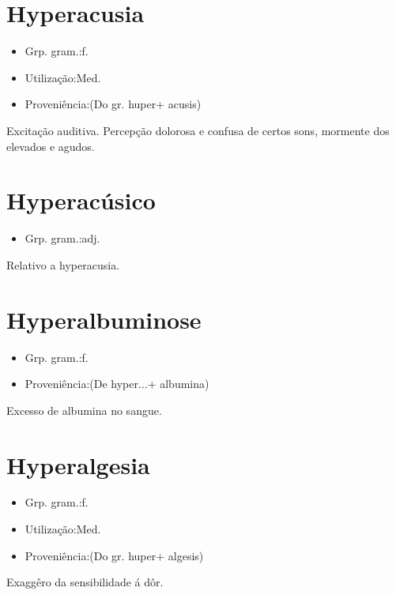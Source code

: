 \documentclass{article}
\begin{document}
\section{Hyperacusia}
\begin{itemize}
\item {Grp. gram.:f.}
\end{itemize}
\begin{itemize}
\item {Utilização:Med.}
\end{itemize}
\begin{itemize}
\item {Proveniência:(Do gr. \textunderscore huper\textunderscore  + \textunderscore acusis\textunderscore )}
\end{itemize}
Excitação auditiva.
Percepção dolorosa e confusa de certos sons, mormente dos elevados e agudos.
\section{Hyperacúsico}
\begin{itemize}
\item {Grp. gram.:adj.}
\end{itemize}
Relativo a hyperacusia.
\section{Hyperalbuminose}
\begin{itemize}
\item {Grp. gram.:f.}
\end{itemize}
\begin{itemize}
\item {Proveniência:(De \textunderscore hyper...\textunderscore  + \textunderscore albumina\textunderscore )}
\end{itemize}
Excesso de albumina no sangue.
\section{Hyperalgesia}
\begin{itemize}
\item {Grp. gram.:f.}
\end{itemize}
\begin{itemize}
\item {Utilização:Med.}
\end{itemize}
\begin{itemize}
\item {Proveniência:(Do gr. \textunderscore huper\textunderscore  + \textunderscore algesis\textunderscore )}
\end{itemize}
Exaggêro da sensibilidade á dôr.
\end{document}
